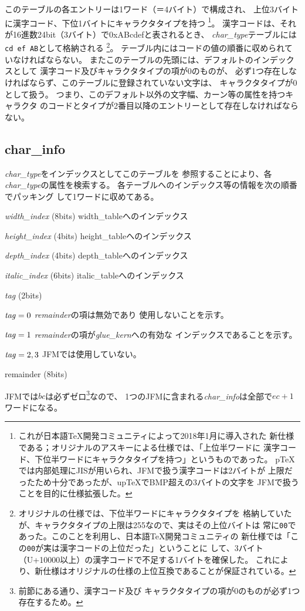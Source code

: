 \documentclass[twoside]{jarticle}
\begin{document}
このテーブルの各エントリーは1ワード（＝4バイト）で構成され、
上位3バイトに漢字コード、下位1バイトにキャラクタタイプを持つ
\footnote{これが日本語\TeX{}開発コミュニティによって2018年1月に導入された
新仕様である；オリジナルのアスキーによる仕様では、「上位半ワードに
漢字コード、下位半ワードにキャラクタタイプを持つ」というものであった。
p\TeX{}では内部処理にJISが用いられ、JFMで扱う漢字コードは2バイトが
上限だったため十分であったが、up\TeX{}でBMP超えの3バイトの文字を
JFMで扱うことを目的に仕様拡張した。}。
漢字コードは、それが16進数24bit（3バイト）で0xABcdefと表されるとき、
{\it char\_type}テーブルには{\tt cd ef AB}として格納される
\footnote{オリジナルの仕様では、下位半ワードにキャラクタタイプを
格納していたが、キャラクタタイプの上限は255なので、実はその上位バイトは
常に{\tt 00}であった。このことを利用し、日本語\TeX{}開発コミュニティの
新仕様では「この{\tt 00}が実は漢字コードの上位だった」ということに
して、3バイト（U+10000以上）の漢字コードで不足する1バイトを確保した。
これにより、新仕様はオリジナルの仕様の上位互換であることが保証されている。}。
テーブル内にはコードの値の順番に収められていなければならない。
またこのテーブルの先頭には、デフォルトのインデックスとして
漢字コード及びキャラクタタイプの項が0のものが、
必ず1つ存在しなければならず、このテーブルに登録されていない文字は、
キャラクタタイプが0として扱う。
つまり、このデフォルト以外の文字幅、カーン等の属性を持つキャラクタ
のコードとタイプが2番目以降のエントリーとして存在しなければならない。

\subsection{char\_info}
{\it char\_type}をインデックスとしてこのテーブルを
参照することにより、各{\it char\_type}の属性を検索する。
各テーブルへのインデックス等の情報を次の順番でパッキング
して1ワードに収めてある。
\begin{description}
\item{{\it width\_index} (8bits)} width\_tableへのインデックス
\item{{\it height\_index} (4bits)} height\_tableへのインデックス
\item{{\it depth\_index} (4bits)} depth\_tableへのインデックス
\item{{\it italic\_index} (6bits)} italic\_tableへのインデックス
\item{{\it tag} (2bits)}
	\begin{description}
	\item{${\it tag}=0$} {\it remainder}の項は無効であり
		使用しないことを示す。
	\item{${\it tag}=1$} {\it remainder}の項が{\it glue\_kern}への有効な
		インデックスであることを示す。
	\item{${\it tag}=2, 3$} JFMでは使用していない。
	\end{description}
\item{remainder (8bits)}
\end{description}
JFMでは$bc$は必ずゼロ\footnote{前節にある通り、漢字コード及び
キャラクタタイプの項が0のものが必ず1つ存在するため。}なので、
1つのJFMに含まれる{\it char\_info}は全部で$ec+1$ワードになる。
\end{document}
